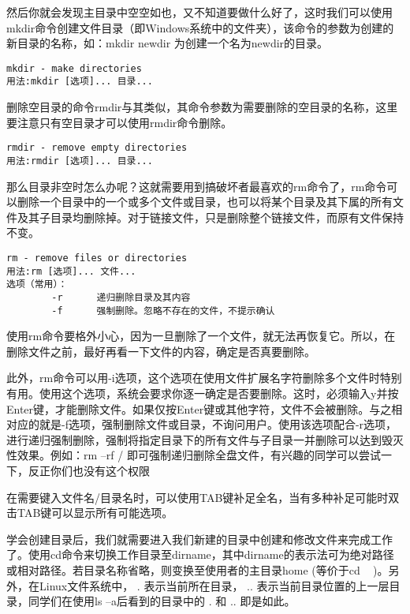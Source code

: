 然后你就会发现主目录中空空如也，又不知道要做什么好了，这时我们可以使用mkdir命令创建文件目录（即Windows系统中的文件夹），该命令的参数为创建的新目录的名称，如：mkdir newdir 为创建一个名为newdir的目录。

\begin{verbatim}
mkdir - make directories
用法:mkdir [选项]... 目录...
\end{verbatim}

删除空目录的命令rmdir与其类似，其命令参数为需要删除的空目录的名称，这里要注意只有空目录才可以使用rmdir命令删除。

\begin{verbatim}
rmdir - remove empty directories
用法:rmdir [选项]... 目录...
\end{verbatim}

那么目录非空时怎么办呢？这就需要用到搞破坏者最喜欢的rm命令了，rm命令可以删除一个目录中的一个或多个文件或目录，也可以将某个目录及其下属的所有文件及其子目录均删除掉。对于链接文件，只是删除整个链接文件，而原有文件保持不变。

\begin{verbatim}
rm - remove files or directories
用法:rm [选项]... 文件...
选项（常用）：
		-r		递归删除目录及其内容
		-f		强制删除。忽略不存在的文件，不提示确认
\end{verbatim}

\begin{note}
使用rm命令要格外小心，因为一旦删除了一个文件，就无法再恢复它。所以，在删除文件之前，最好再看一下文件的内容，确定是否真要删除。
\end{note}

此外，rm命令可以用-i选项，这个选项在使用文件扩展名字符删除多个文件时特别有用。使用这个选项，系统会要求你逐一确定是否要删除。这时，必须输入y并按Enter键，才能删除文件。如果仅按Enter键或其他字符，文件不会被删除。与之相对应的就是-f选项，强制删除文件或目录，不询问用户。使用该选项配合-r选项，进行递归强制删除，强制将指定目录下的所有文件与子目录一并删除可以达到毁灭性效果。例如：rm –rf / 即可强制递归删除全盘文件，有兴趣的同学可以尝试一下，反正你们也没有这个权限~

\begin{note}
在需要键入文件名/目录名时，可以使用TAB键补足全名，当有多种补足可能时双击TAB键可以显示所有可能选项。
\end{note}

学会创建目录后，我们就需要进入我们新建的目录中创建和修改文件来完成工作了。使用cd命令来切换工作目录至dirname，其中dirname的表示法可为绝对路径或相对路径。若目录名称省略，则变换至使用者的主目录home (等价于cd ~ )。另外，在Linux文件系统中， . 表示当前所在目录， .. 表示当前目录位置的上一层目录，同学们在使用ls –a后看到的目录中的 . 和 .. 即是如此。

